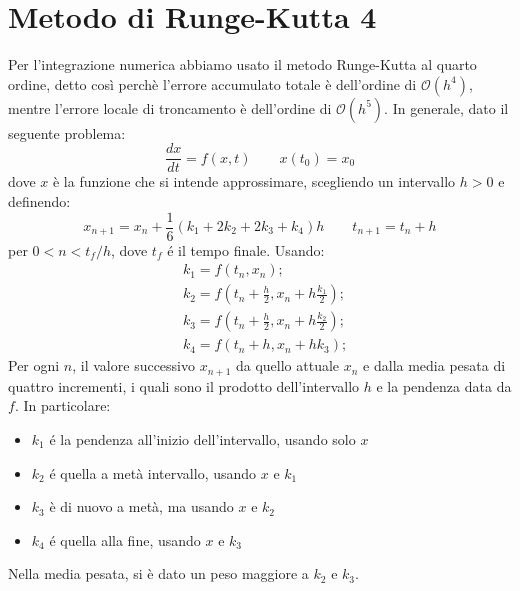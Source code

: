 \section{Metodo di Runge-Kutta 4}
Per l'integrazione numerica abbiamo usato il metodo Runge-Kutta al quarto ordine, detto così perchè l'errore accumulato totale è dell'ordine di $ \mathcal{O}(h^{4}) $, mentre l'errore locale di troncamento è dell'ordine di $ \mathcal{O}(h^{5}) $. 
In generale, dato il seguente problema:
\begin{equation} \tag{A1}
\frac{dx}{dt}=f(x,t)\qquad x(t_{0})=x_{0}
\end{equation}
dove $ x $ è la funzione che si intende approssimare, scegliendo un intervallo $ h>0 $ e definendo:
\begin{equation} \tag{A2}
	x_{n+1}=x_{n}+\frac{1}{6}(k_{1}+2k_{2}+2k_{3}+k_{4})h \qquad t_{n+1}=t_{n}+h
\end{equation}
per $ 0<n<t_{f}/h $, dove $ t_{f} $ é il tempo finale. Usando:
\begin{equation} \tag{A3}
	\begin{aligned}
	&k_{1}=f(t_{n}, x_{n});\\
	&k_{2}=f(t_{n}+\frac{h}{2}, x_{n}+h\frac{k_{1}}{2});\\
	&k_{3}=f(t_{n}+\frac{h}{2}, x_{n}+h\frac{k_{2}}{2});\\
	&k_{4}=f(t_{n}+h, x_{n}+hk_{3});
\end{aligned}
\end{equation}
Per ogni $ n $, il valore successivo $ x_{n+1} $ da quello attuale $ x_{n} $ e dalla media pesata di quattro incrementi, i quali sono il prodotto dell'intervallo $ h $ e la pendenza data da $ f $. In particolare:
\begin{itemize}
	\item $ k_{1} $ é la pendenza all'inizio dell'intervallo, usando solo $ x $ 
	\item $ k_{2} $ é quella a metà intervallo, usando $ x $ e $ k_{1} $
	\item $ k_{3} $ è di nuovo a metà, ma usando $ x $ e $ k_{2} $
	\item $ k_{4} $ é quella alla fine, usando $ x $ e $ k_{3} $
\end{itemize}
Nella media pesata, si è dato un peso maggiore a $ k_{2} $ e $ k_{3} $.